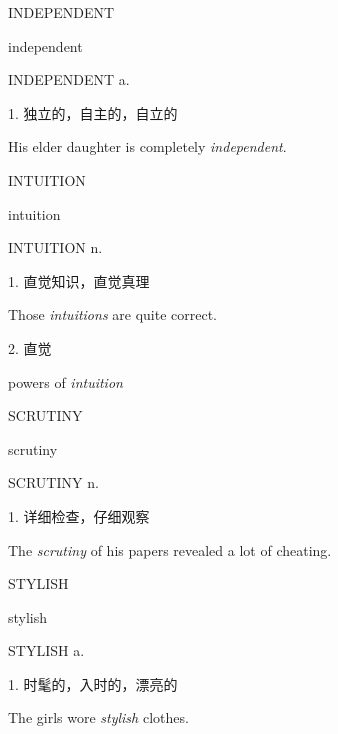 \begin{flashcard}{
INDEPENDENT

independent
}
\begin{center}
INDEPENDENT a. 
\end{center}
1. 独立的，自主的，自立的

His elder daughter is completely \textit{independent}.

\end{flashcard}
\begin{flashcard}{
INTUITION

intuition
}
\begin{center}
INTUITION n. 
\end{center}
1. 直觉知识，直觉真理

Those \textit{intuitions} are quite correct.

2. 直觉

powers of \textit{intuition}

\end{flashcard}
\begin{flashcard}{
SCRUTINY

scrutiny
}
\begin{center}
SCRUTINY n. 
\end{center}
1. 详细检查，仔细观察

The \textit{scrutiny} of his papers revealed a lot of cheating.

\end{flashcard}
\begin{flashcard}{
STYLISH

stylish
}
\begin{center}
STYLISH a. 
\end{center}
1. 时髦的，入时的，漂亮的

The girls wore \textit{stylish} clothes.

\end{flashcard}
